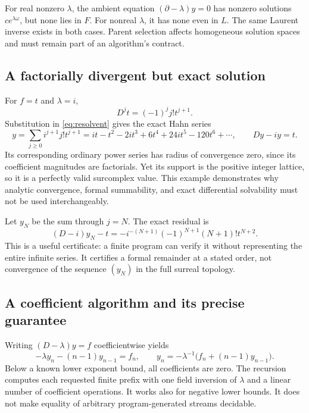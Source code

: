 \documentclass[11pt]{article}
\numberwithin{equation}{section}
\theoremstyle{definition}
\newcommand{\DD}{\partial}
\begin{document}
For real nonzero $\lambda$, the ambient equation
$(\DD-\lambda)y=0$ has nonzero solutions $ce^{\lambda\omega}$,
but none lies in $F$. For nonreal $\lambda$, it has none even in $L$.
The same Laurent inverse exists in both cases. Parent selection affects
homogeneous solution spaces and must remain part of an algorithm's
contract.

\subsection{A factorially divergent but exact solution}
For $f=t$ and $\lambda=i$,
\[
 D^jt=(-1)^j j!t^{j+1}.
\]
Substitution in \eqref{eq:resolvent} gives the exact Hahn series
\begin{equation}\label{eq:factorialsolution}
 y=\sum_{j\ge0}i^{j+1}j!t^{j+1}
   =it-t^2-2it^3+6t^4+24it^5-120t^6+\cdots,
 \qquad Dy-iy=t.
\end{equation}
Its corresponding ordinary power series has radius of convergence zero,
since its coefficient magnitudes are factorials. Yet its support is the
positive integer lattice, so it is a perfectly valid surcomplex value.
This example demonstrates why analytic convergence, formal summability,
and exact differential solvability must not be used interchangeably.

Let $y_N$ be the sum through $j=N$. The exact residual is
\begin{equation}\label{eq:factorialresidual}
 (D-i)y_N-t
   =-i^{-(N+1)}(-1)^{N+1}(N+1)!t^{N+2}.
\end{equation}
This is a useful certificate: a finite program can verify it without
representing the entire infinite series. It certifies a formal remainder
at a stated order, not convergence of the sequence $(y_N)$ in the full
surreal topology.

\subsection{A coefficient algorithm and its precise guarantee}
Writing $(D-\lambda)y=f$ coefficientwise yields
\begin{equation}\label{eq:coefficientrecursion}
 -\lambda y_n-(n-1)y_{n-1}=f_n,
 \qquad
 y_n=-\lambda^{-1}\bigl(f_n+(n-1)y_{n-1}\bigr).
\end{equation}
Below a known lower exponent bound, all coefficients are zero. The
recursion computes each requested finite prefix with one field inversion
of $\lambda$ and a linear number of coefficient operations. It works
also for negative lower bounds. It does not make equality of arbitrary
program-generated streams decidable.
\end{document}
